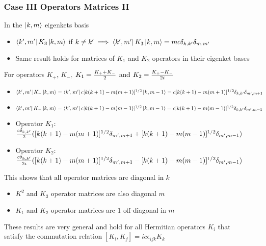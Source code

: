 \documentclass[8pt,t,mathserif,aspectratio=169]{beamer}
\begin{document}
\begin{frame}
  \frametitle{Case III Operators Matrices II}
  \vspace{1mm}
  In the $\ket{k,m}$ eigenkets basis
  \begin{itemize}
    \item $\bra{k',m'} K_3 \ket{k,m}$ if $k \neq k' \implies \bra{k',m'} K_3 \ket{k,m} = mc \delta_{k,k'}\delta_{m,m'}$
    \item Same result holds for matrices of $K_1$ and $K_2$ operators in their eigenket bases
  \end{itemize}
  For operators $K_{+}$, $K_{-}$, $K_1 = {K_{+} + K_{-} \over 2}$ and $K_2 = {K_{+} - K_{-} \over 2i}$
  \begin{itemize}
    \item $\bra{k',m'} K_{+} \ket{k,m} = \bra{k',m'} c[k(k + 1) - m(m + 1)]^{1/2} \ket{k,m - 1} = c[k(k + 1) - m(m + 1)]^{1/2} \delta_{k,k'} \delta_{m',m + 1}$
    \item $\bra{k',m'} K_{-} \ket{k,m} = \bra{k',m'} c[k(k + 1) - m(m - 1)]^{1/2} \ket{k,m - 1} = c[k(k + 1) - m(m - 1)]^{1/2} \delta_{k,k'} \delta_{m',m - 1}$
    \item Operator $K_1$: ${c \delta_{k,k'} \over 2} ([k(k + 1) - m(m + 1)]^{1/2} \delta_{m',m + 1} + [k(k + 1) - m(m - 1)]^{1/2} \delta_{m',m - 1})$
    \item Operator $K_2$: ${c \delta_{k,k'} \over 2i} ([k(k + 1) - m(m + 1)]^{1/2} \delta_{m',m + 1} - [k(k + 1) - m(m - 1)]^{1/2} \delta_{m',m - 1})$
  \end{itemize}
  This shows that all operator matrices are diagonal in $k$
  \begin{itemize}
    \item $K^2$ and $K_3$ operator matrices are also diagonal $m$
    \item $K_1$ and $K_2$ operator matrices are $1$ off-diagonal in $m$
  \end{itemize}
  These results are very general and hold for all Hermitian operators $K_i$ that satisfy the commutation relation $[K_i,K_j] = i c \epsilon_{ijk} K_k$
\end{frame}
\end{document}
